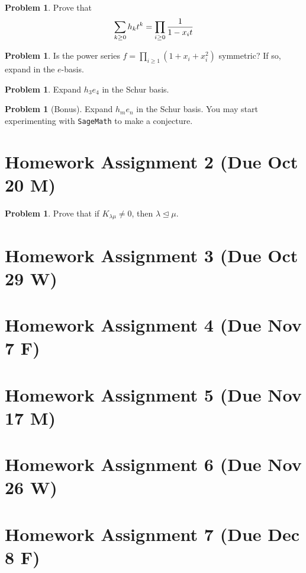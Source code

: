 \documentclass{amsart}
\theoremstyle{plain}
\theoremstyle{definition}
\newtheorem{problem}[theorem]{Problem}
\begin{document}
	\begin{problem}
		Prove that
		\[\sum_{k\geq 0} h_k t^k = \prod_{i\geq0}{1\over 1-x_it}\]
	\end{problem}
	
	\begin{problem}
		Is the power series $f=\prod_{i\geq 1}(1+x_i+x_i^2)$ symmetric? If so, expand in the $e$-basis.
	\end{problem}
		\begin{problem}
		Expand $h_3e_4$ in the Schur basis. 	
	\end{problem}
	\begin{problem}
		[Bonus] Expand $h_me_n$ in the Schur basis. You may start experimenting with {\tt{SageMath}} to make a conjecture.
	\end{problem}
	
	
	\section{Homework Assignment 2 (Due Oct 20 M)}
	\begin{problem}
		Prove that if $K_{\lambda\mu}\neq 0$, then $\lambda\trianglelefteq \mu$.
	\end{problem}

	
	\section{Homework Assignment 3 (Due Oct 29 W)}
	\section{Homework Assignment 4 (Due Nov 7 F)}
	\section{Homework Assignment 5 (Due Nov 17 M)}
	\section{Homework Assignment 6 (Due Nov 26 W)}
	\section{Homework Assignment 7 (Due Dec 8 F)}


	
	
	
	
	
	
	
	
\end{document}
